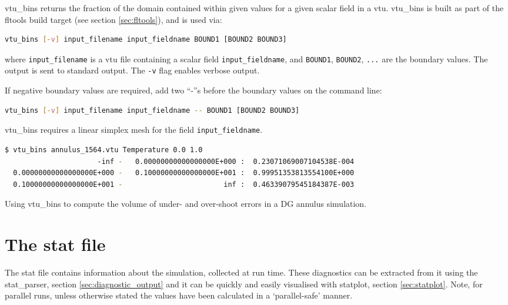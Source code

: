 vtu\_bins returns the fraction of the domain contained within given values
for a given scalar field in a vtu. vtu\_bins is built as part of the fltools
build target (see section \ref{sec:fltools}), and is used via:

\begin{lstlisting}[language = Bash]
vtu_bins [-v] input_filename input_fieldname BOUND1 [BOUND2 BOUND3]
\end{lstlisting}

where \lstinline[language = Bash]+input_filename+ is a vtu file containing a scalar
field \lstinline[language = Bash]+input_fieldname+, and
\lstinline[language = Bash]+BOUND1+, \lstinline[language = Bash]+BOUND2+,
\lstinline[language = Bash]+...+ are the boundary values. The output is sent to
standard output. The \lstinline[language = Bash]+-v+ flag enables verbose output.

If negative boundary values are required, add two ``-''s before the boundary
values on the command line:

\begin{lstlisting}[language = Bash]
vtu_bins [-v] input_filename input_fieldname -- BOUND1 [BOUND2 BOUND3]
\end{lstlisting}

vtu\_bins requires a linear simplex mesh for the field
\lstinline[language = Bash]+input_fieldname+.

\begin{example}
  \begin{lstlisting}[language = Bash]
$ vtu_bins annulus_1564.vtu Temperature 0.0 1.0
                      -inf -   0.00000000000000000E+000 :  0.23071069007104538E-004
  0.00000000000000000E+000 -   0.10000000000000000E+001 :  0.99951353813554100E+000
  0.10000000000000000E+001 -                        inf :  0.46339079545184387E-003
  \end{lstlisting}%
\caption{Using vtu\_bins to compute the volume of under- and over-shoot errors in
         a DG annulus simulation.}
\end{example}


\section{The stat file}
\label{sec:diagnostics_stat_file}

The stat file contains information about the simulation, collected at run time. These diagnostics can be extracted from it using the stat\_parser, section \ref{sec:diagnostic_output} and it can be quickly and easily visualised with statplot, section \ref{sec:statplot}. Note, for parallel runs, unless otherwise stated the values have been calculated in a `parallel-safe' manner.

